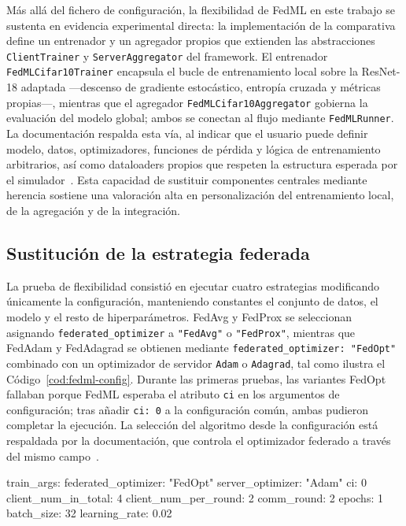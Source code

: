 Más allá del fichero de configuración, la flexibilidad de FedML en este trabajo se
sustenta en evidencia experimental directa: la implementación de la comparativa
define un entrenador y un agregador propios que extienden las abstracciones
\texttt{ClientTrainer} y \texttt{ServerAggregator} del
framework. El entrenador \texttt{FedMLCifar10Trainer} encapsula el bucle de
entrenamiento local sobre la ResNet-18 adaptada —descenso de gradiente estocástico,
entropía cruzada y métricas propias—, mientras que el agregador
\texttt{FedMLCifar10Aggregator} gobierna la evaluación del modelo global; ambos se
conectan al flujo mediante \texttt{FedMLRunner}. La documentación respalda esta vía,
al indicar que el usuario puede definir modelo, datos, optimizadores, funciones de
pérdida y lógica de entrenamiento arbitrarios, así como dataloaders propios que
respeten la estructura esperada por el simulador~\parencite{fedmlTrainer,fedmlDataloader}.
Esta capacidad de sustituir componentes centrales mediante herencia sostiene una
valoración alta en personalización del entrenamiento local, de la agregación y de la
integración.

\subsection{Sustitución de la estrategia federada}\label{subsec:flex-fedml-strategy}

La prueba de flexibilidad consistió en ejecutar cuatro estrategias modificando
únicamente la configuración, manteniendo constantes el conjunto de datos, el
modelo y el resto de hiperparámetros. FedAvg y FedProx se seleccionan asignando
\texttt{federated\_optimizer} a \texttt{"FedAvg"} o \texttt{"FedProx"}, mientras que
FedAdam y FedAdagrad se obtienen mediante \texttt{federated\_optimizer:\ "FedOpt"}
combinado con un optimizador de servidor \texttt{Adam} o \texttt{Adagrad}, tal como
ilustra el Código~\ref{cod:fedml-config}. Durante las primeras pruebas, las
variantes FedOpt fallaban porque FedML esperaba el atributo \texttt{ci} en los
argumentos de configuración; tras añadir \texttt{ci:\ 0} a la configuración común,
ambas pudieron completar la ejecución. La selección del algoritmo desde la
configuración está respaldada por la documentación, que controla el optimizador
federado a través del mismo campo~\parencite{fedmlSimApi}.

\begin{yamlcode}[title={Fragmento de fedml\_config.yaml (FedAdam vía FedOpt)}, label={cod:fedml-config}]
train_args:
  federated_optimizer: "FedOpt"
  server_optimizer: "Adam"
  ci: 0
  client_num_in_total: 4
  client_num_per_round: 2
  comm_round: 2
  epochs: 1
  batch_size: 32
  learning_rate: 0.02
\end{yamlcode}

